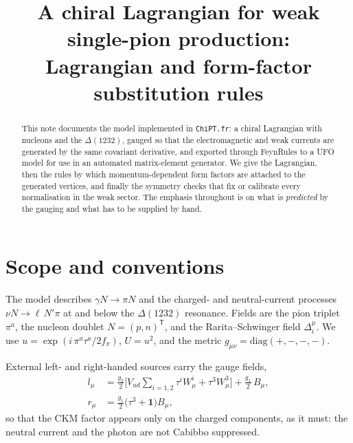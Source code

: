 \documentclass[11pt,a4paper]{article}
\title{A chiral Lagrangian for weak single-pion production:\\
       Lagrangian and form-factor substitution rules}
\author{}
\date{}
\newcommand{\code}[1]{\texttt{\small #1}}
\begin{document}
\maketitle

\begin{abstract}
This note documents the model implemented in \code{ChiPT.fr}: a chiral
Lagrangian with nucleons and the $\Delta(1232)$, gauged so that the
electromagnetic and weak currents are generated by the same covariant
derivative, and exported through FeynRules to a UFO model for use in an
automated matrix-element generator. We give the Lagrangian, then the rules by
which momentum-dependent form factors are attached to the generated vertices,
and finally the symmetry checks that fix or calibrate every normalisation in the
weak sector. The emphasis throughout is on what is \emph{predicted} by the
gauging and what has to be supplied by hand.
\end{abstract}

\section{Scope and conventions}

The model describes $\gamma N \to \pi N$ and the charged- and neutral-current
processes $\nu N \to \ell\, N' \pi$ at and below the $\Delta(1232)$ resonance.
Fields are the pion triplet $\pi^a$, the nucleon doublet
$N = (p,n)^{\mathsf T}$, and the Rarita--Schwinger field $\Delta^{\mu}_{i}$.
We use $u = \exp(i\,\pi^a\tau^a/2f_\pi)$, $U = u^2$, and the metric
$g_{\mu\nu} = \mathrm{diag}(+,-,-,-)$.

External left- and right-handed sources carry the gauge fields,
\begin{align}
  l_\mu &= \frac{g_2}{2}\Big[V_{ud}\sum_{i=1,2}\tau^i W^i_\mu
            + \tau^3 W^3_\mu\Big] + \frac{g_1}{2}\,B_\mu ,
  \label{eq:lmat}\\
  r_\mu &= \frac{g_1}{2}\big(\tau^3 + \mathbf{1}\big) B_\mu ,
  \label{eq:rmat}
\end{align}
so that the CKM factor appears only on the charged components, as it must: the
neutral current and the photon are not Cabibbo suppressed.
\end{document}
